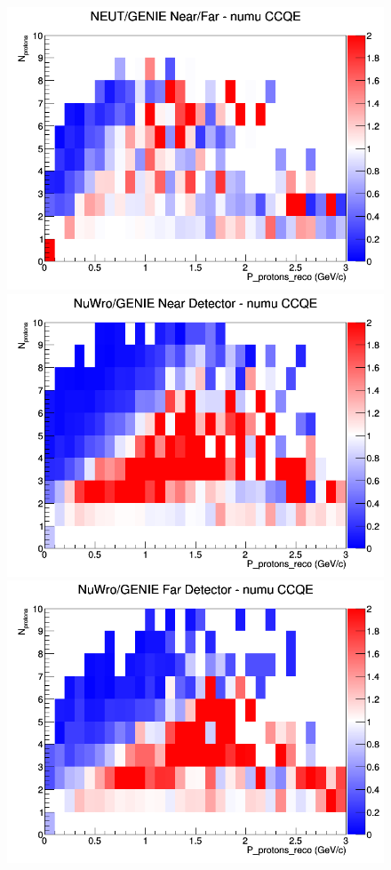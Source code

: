 \begin{figure}[h]
\endminipage
{}
\includegraphics[width=\linewidth]{eff_N_P/GAr/protons/ratios/CCQE_NEUT_GENIE_numu_NF_N_P.png}
\endminipage
\newline
{}
\includegraphics[width=\linewidth]{eff_N_P/GAr/protons/ratios/CCQE_NuWro_GENIE_numu_near_N_P.png}
\endminipage
{}
\includegraphics[width=\linewidth]{eff_N_P/GAr/protons/ratios/CCQE_NuWro_GENIE_numu_far_N_P.png}

\end{figure}
